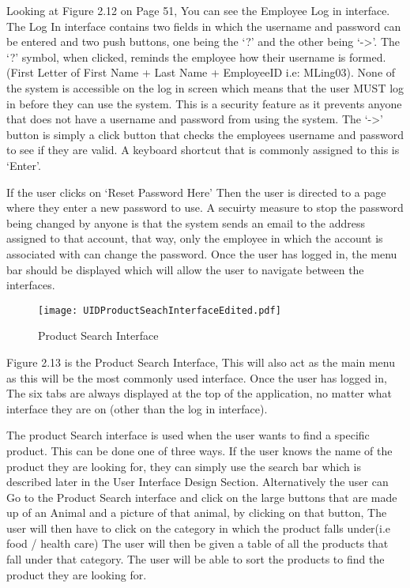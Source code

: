 \begin{flushleft}
Looking at Figure 2.12 on Page 51, You can see the Employee Log in interface. The Log In interface contains two fields in which the username and password can be entered and two push buttons, one being the `?' and the other being `->'. The `?' symbol, when clicked, reminds the employee how their username is formed. (First Letter of First Name + Last Name + EmployeeID i.e: MLing03). None of the system is accessible on the log in screen which means that the user MUST log in before they can use the system. This is a security feature as it prevents anyone that does not have a username and password from using the system. The `->' button is simply a click button that checks the employees username and password to see if they are valid. A keyboard shortcut that is commonly assigned to this is `Enter'. \par

If the user clicks on `Reset Password Here' Then the user is directed to a page where they enter a new password to use. A secuirty measure to stop the password being changed by anyone is that the system sends an email to the address assigned to that account, that way, only the employee in which the account is associated with can change the password.  Once the user has logged in, the menu bar should be displayed which will allow the user to navigate between the interfaces.\par

\end{flushleft}

\begin{figure}[H]
\caption{Product Search Interface} \label{fig: Product Search Interface}
\hfill\texttt{[image: UIDProductSeachInterfaceEdited.pdf]}\hspace*{\fill}
\end{figure}

Figure 2.13 is the Product Search Interface, This will also act as the main menu as this will be the most commonly used interface. Once the user has logged in, The six tabs are always displayed at the top of the application, no matter what interface they are on (other than the log in interface). \par

The product Search interface is used when the user wants to find a specific product. This can be done one of three ways. If the user knows the name of the product they are looking for, they can simply use the search bar which is described later in the User Interface Design Section. Alternatively the user can Go to the Product Search interface and click on the large buttons that are made up of an Animal and a picture of that animal, by clicking on that button, The user will then have to click on the category in which the product falls under(i.e food / health care) The user will then be given a table of all the products that fall under that category. The user will be able to sort the products to find the product they are looking for. \par

